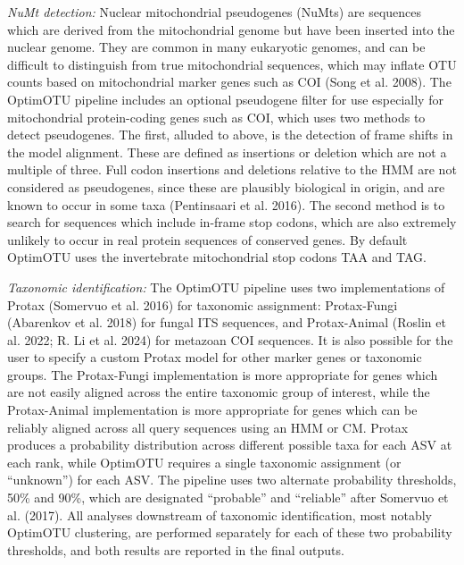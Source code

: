 \documentclass[
]{article}
\begin{document}
\emph{NuMt detection:}
Nuclear mitochondrial pseudogenes (NuMts) are sequences which are derived from the mitochondrial genome but have been inserted into the nuclear genome.
They are common in many eukaryotic genomes, and can be difficult to distinguish from true mitochondrial sequences, which may inflate OTU counts based on mitochondrial marker genes such as COI (Song et al. 2008).
The OptimOTU pipeline includes an optional pseudogene filter for use especially for mitochondrial protein-coding genes such as COI, which uses two methods to detect pseudogenes.
The first, alluded to above, is the detection of frame shifts in the model alignment.
These are defined as insertions or deletion which are not a multiple of three.
Full codon insertions and deletions relative to the HMM are not considered as pseudogenes, since these are plausibly biological in origin, and are known to occur in some taxa (Pentinsaari et al. 2016).
The second method is to search for sequences which include in-frame stop codons, which are also extremely unlikely to occur in real protein sequences of conserved genes.
By default OptimOTU uses the invertebrate mitochondrial stop codons TAA and TAG.

\emph{Taxonomic identification:}
The OptimOTU pipeline uses two implementations of Protax (Somervuo et al. 2016) for taxonomic assignment:
Protax-Fungi (Abarenkov et al. 2018) for fungal ITS sequences, and Protax-Animal (Roslin et al. 2022; R. Li et al. 2024) for metazoan COI sequences.
It is also possible for the user to specify a custom Protax model for other marker genes or taxonomic groups.
The Protax-Fungi implementation is more appropriate for genes which are not easily aligned across the entire taxonomic group of interest, while the Protax-Animal implementation is more appropriate for genes which can be reliably aligned across all query sequences using an HMM or CM.
Protax produces a probability distribution across different possible taxa for each ASV at each rank, while OptimOTU requires a single taxonomic assignment (or ``unknown'') for each ASV.
The pipeline uses two alternate probability thresholds, 50\% and 90\%, which are designated ``probable'' and ``reliable'' after Somervuo et al. (2017).
All analyses downstream of taxonomic identification, most notably OptimOTU clustering, are performed separately for each of these two probability thresholds, and both results are reported in the final outputs.
\end{document}
